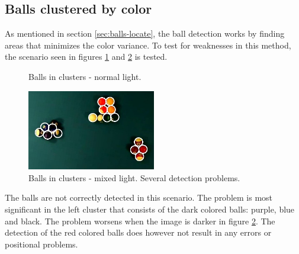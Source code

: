 \subsection{Balls clustered by color}
As mentioned in section \ref{sec:balls-locate}, the ball detection works by finding areas that minimizes the color variance. To test for weaknesses in this method, the scenario seen in figures \ref{fig:clustersnormal} and \ref{fig:clustersmixed} is tested.
\begin{figure}[htpb]
  \centering
  \quad
	\quad
   \caption{Balls in clusters - normal light.}
  \label{fig:clustersnormal}
\end{figure}

\begin{figure}[htpb]
  \centering
\includegraphics[width=0.5\textwidth]{images/test/mixed1/clusters-2}
   \caption{Balls in clusters - mixed light. Several detection problems.}
  \label{fig:clustersmixed}
\end{figure}
The balls are not correctly detected in this scenario. The problem is most significant in the left cluster that consists of the dark colored balls: purple, blue and black. The problem worsens when the image is darker in figure \ref{fig:clustersmixed}. The detection of the red colored balls does however not result in any errors or positional problems. 


